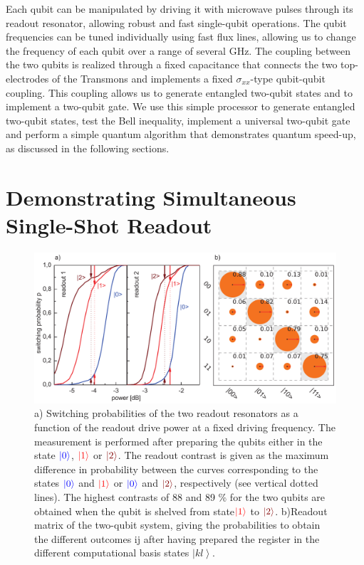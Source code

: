 Each qubit can be manipulated by driving it with microwave pulses
through its readout resonator, allowing robust and fast single-qubit
operations. The qubit frequencies can be tuned individually using
fast flux lines, allowing us to change the frequency of each qubit
over a range of several GHz. The coupling between the two qubits is
realized through a fixed capacitance that connects the two top-electrodes
of the Transmons and implements a fixed $\sigma_{xx}$-type qubit-qubit
coupling. This coupling allows us to generate entangled two-qubit
states and to implement a two-qubit gate. We use this simple processor
to generate entangled two-qubit states, test the Bell inequality,
implement a universal two-qubit gate and perform a simple quantum
algorithm that demonstrates quantum speed-up, as discussed
in the following sections.


\section{Demonstrating Simultaneous Single-Shot Readout}

%
\begin{figure}[ht!]
 \centering
\includegraphics[width=\textwidth]{"./data/ct5/2011_04_21 - grover and tomo/good_data/s curves and readout"}
\caption[Switching probabilities of the two qubit readouts as a function of
the readout excitation power]{a) Switching probabilities of the two readout resonators
as a function of the readout drive power at a fixed driving frequency.
The measurement is performed after preparing the qubits either in the state
${\color{blue}{\left| 0 \right>}}$, ${\color{red}{\left| 1 \right>}}$ or ${\color{brown}{\ket{2}}}$.
The readout contrast is given as the maximum difference in probability between
the curves corresponding to the states ${\color{blue}{\left| 0 \right>}}$
and ${\color{red}{\left| 1 \right>}}$ or ${\color{blue}{\left| 0 \right>}}$ and ${\color{brown}{\ket{2}}}$, respectively (see vertical  dotted lines). The highest contrasts of 88 and 89 \% for the two qubits are obtained when the qubit
is shelved from state${\color{red}{\left| 1 \right>}}$ to ${\color{brown}{\ket{2}}}$.
b)Readout matrix of the two-qubit system, giving the probabilities to obtain the different outcomes ij after having
prepared the register in the different computational basis states
$\left|kl\right\rangle $.}


\label{fig:qubit_readout_characteristics} %
\end{figure}


